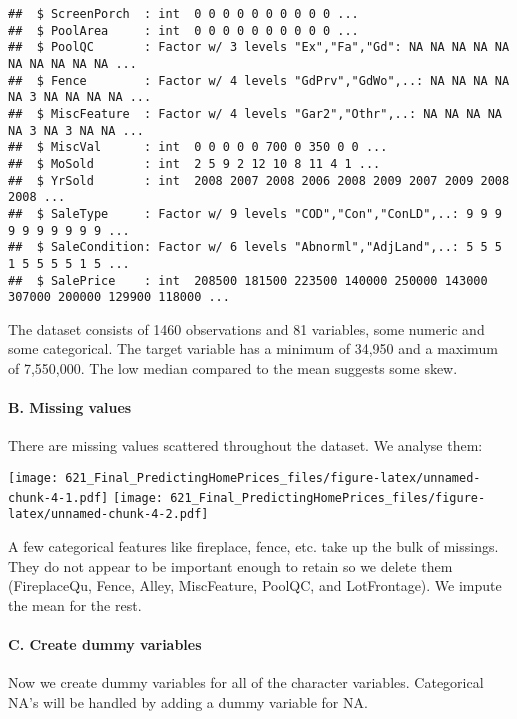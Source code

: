 \documentclass[
]{article}
\begin{document}
\begin{verbatim}
##  $ ScreenPorch  : int  0 0 0 0 0 0 0 0 0 0 ...
##  $ PoolArea     : int  0 0 0 0 0 0 0 0 0 0 ...
##  $ PoolQC       : Factor w/ 3 levels "Ex","Fa","Gd": NA NA NA NA NA NA NA NA NA NA ...
##  $ Fence        : Factor w/ 4 levels "GdPrv","GdWo",..: NA NA NA NA NA 3 NA NA NA NA ...
##  $ MiscFeature  : Factor w/ 4 levels "Gar2","Othr",..: NA NA NA NA NA 3 NA 3 NA NA ...
##  $ MiscVal      : int  0 0 0 0 0 700 0 350 0 0 ...
##  $ MoSold       : int  2 5 9 2 12 10 8 11 4 1 ...
##  $ YrSold       : int  2008 2007 2008 2006 2008 2009 2007 2009 2008 2008 ...
##  $ SaleType     : Factor w/ 9 levels "COD","Con","ConLD",..: 9 9 9 9 9 9 9 9 9 9 ...
##  $ SaleCondition: Factor w/ 6 levels "Abnorml","AdjLand",..: 5 5 5 1 5 5 5 5 1 5 ...
##  $ SalePrice    : int  208500 181500 223500 140000 250000 143000 307000 200000 129900 118000 ...
\end{verbatim}

The dataset consists of 1460 observations and 81 variables, some numeric
and some categorical. The target variable has a minimum of 34,950 and a
maximum of 7,550,000. The low median compared to the mean suggests some
skew.

\hypertarget{b.-missing-values}{%
\paragraph{B. Missing values}\label{b.-missing-values}}

There are missing values scattered throughout the dataset. We analyse
them:

\texttt{[image: 621\_Final\_PredictingHomePrices\_files/figure-latex/unnamed-chunk-4-1.pdf]}
\texttt{[image: 621\_Final\_PredictingHomePrices\_files/figure-latex/unnamed-chunk-4-2.pdf]}

A few categorical features like fireplace, fence, etc. take up the bulk
of missings. They do not appear to be important enough to retain so we
delete them (FireplaceQu, Fence, Alley, MiscFeature, PoolQC, and
LotFrontage). We impute the mean for the rest.

\hypertarget{c.-create-dummy-variables}{%
\paragraph{C. Create dummy variables}\label{c.-create-dummy-variables}}

Now we create dummy variables for all of the character variables.
Categorical NA's will be handled by adding a dummy variable for NA.
\end{document}
